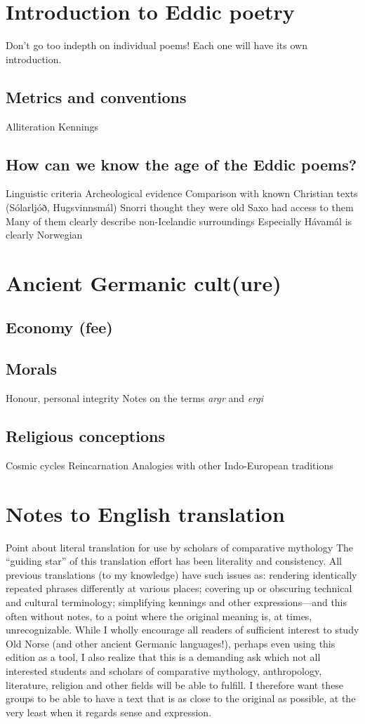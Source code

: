 \newpage


\section{Introduction to Eddic poetry}
  Don't go too indepth on individual poems! Each one will have its own introduction.
  \subsection{Metrics and conventions}
    Alliteration
    Kennings
  \subsection{How can we know the age of the Eddic poems?}
    Linguistic criteria
    Archeological evidence
    Comparison with known Christian texts (Sólarljóð, Hugsvinnsmál)
    Snorri thought they were old
    Saxo had access to them
    Many of them clearly describe non-Icelandic surroundings
      Especially Hávamál is clearly Norwegian

\section{Ancient Germanic cult(ure)}
  \subsection{Economy (fee)}
  \subsection{Morals}
    Honour, personal integrity
    Notes on the terms \emph{argr} and \emph{ergi}
  \subsection{Religious conceptions}
    Cosmic cycles
    Reincarnation
    Analogies with other Indo-European traditions

\section{Notes to English translation}
  Point about literal translation for use by scholars of comparative mythology
    The “guiding star” of this translation effort has been literality and consistency. All previous translations (to my knowledge) have such issues as: rendering identically repeated phrases differently at various places; covering up or obscuring technical and cultural terminology; simplifying kennings and other expressions—and this often without notes, to a point where the original meaning is, at times, unrecognizable.
    While I wholly encourage all readers of sufficient interest to study Old Norse (and other ancient Germanic languages!), perhaps even using this edition as a tool, I also realize that this is a demanding ask which not all interested students and scholars of comparative mythology, anthropology, literature, religion and other fields will be able to fulfill. I therefore want these groups to be able to have a text that is as close to the original as possible, at the very least when it regards sense and expression.

